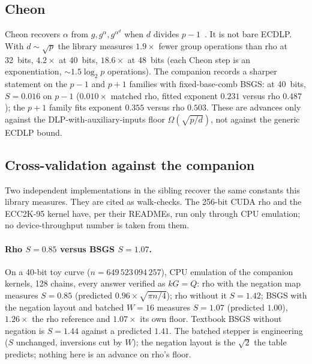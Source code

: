 \subsection{Cheon}

Cheon recovers $\alpha$ from $g,g^{\alpha},g^{\alpha^d}$ when $d$
divides $p-1$~\cite{cheon2006,cheon2010}. It is not bare ECDLP. With
$d\sim\sqrt{p}$ the library measures $1.9\times$ fewer group
operations than rho at 32~bits, $4.2\times$ at 40~bits, $18.6\times$
at 48~bits (each Cheon step is an exponentiation, $\sim 1.5\log_2 p$
operations). The companion
records a sharper statement on the $p-1$ and $p+1$ families with
fixed-base-comb BSGS: at 40~bits, $S=0.016$ on $p-1$ ($0.010\times$
matched rho, fitted exponent $0.231$ versus rho $0.487$); the $p+1$
family fits exponent $0.355$ versus rho $0.503$. These are advances
only against the DLP-with-auxiliary-inputs floor
$\Omega(\sqrt{p/d})$, not against the generic ECDLP
bound.

\subsection{Cross-validation against the companion}
\label{sec:crossval}

Two independent implementations in the sibling recover the same
constants this library measures. They are cited as walk-checks. The
256-bit CUDA rho and the ECC2K-95 kernel have, per their READMEs, run
only through CPU emulation; no device-throughput number is taken from
them.

\paragraph{Rho $S=0.85$ versus BSGS $S=1.07$.}
On a 40-bit toy curve ($n=649\,523\,094\,257$), CPU emulation of the
companion kernels, 128 chains, every answer verified as $kG=Q$: rho
with the negation map measures $S=0.85$ (predicted
$0.96\times\sqrt{\pi n/4}$); rho without it $S=1.42$; BSGS with the
negation layout and batched $W=16$ measures $S=1.07$ (predicted
$1.00$), $1.26\times$ the rho reference and $1.07\times$ its own
floor. Textbook BSGS without negation is $S=1.44$ against a predicted
$1.41$. The batched stepper is engineering ($S$ unchanged, inversions
cut by $W$); the negation layout is the $\sqrt{2}$ the table
predicts; nothing here is an advance on rho's
floor.

